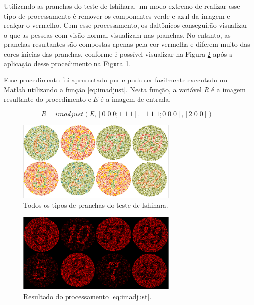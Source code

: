 \documentclass[	12pt, Times, openright, twoside, a4paper, english, brazil]{abntex2}
\begin{document}
Utilizando as pranchas do teste de Ishihara, um modo extremo de realizar esse tipo de processamento é remover os componentes verde e azul da imagem e realçar o vermelho. Com esse processamento, os daltônicos conseguirão visualizar o que as pessoas com visão normal visualizam nas pranchas. No entanto, as pranchas resultantes são compostas apenas pela cor vermelha e diferem muito das cores inicias das pranchas, conforme é possível visualizar na Figura \ref{fig:figuraMatlab3} após a aplicação desse procedimento na Figura \ref{fig:figuraMatlab1}. 

Esse procedimento foi apresentado por  e pode ser facilmente executado no Matlab utilizando a função \ref{eq:imadjust}. Nesta função, a variável $R$ é a imagem resultante do procedimento e $E$ é a imagem de entrada.

\begin{equation}
R=imadjust (E,[0 \; 0 \; 0; 1 \; 1 \; 1],[1 \; 1 \; 1; 0 \; 0 \; 0],[2 \; 0 \; 0]) \label{eq:imadjust}
\end{equation}

\begin{figure}[!htb]
\centering \includegraphics[width=0.7\textwidth]{figuraMatlab1.PNG}
\caption{Todos os tipos de pranchas do teste de Ishihara. \label{fig:figuraMatlab1}}
\end{figure}

\begin{figure}[!htb]
\centering \includegraphics[width=0.7\textwidth]{figuraMatlab3.PNG}
\caption{Resultado do processamento \ref{eq:imadjust}. \label{fig:figuraMatlab3}}
\end{figure}
\end{document}
